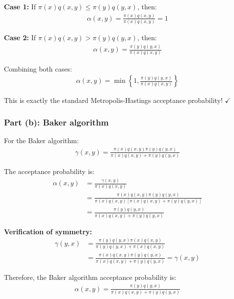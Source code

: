 \documentclass[11pt,a4paper]{article}
\begin{document}
\textbf{Case 1:} If $\pi(x)q(x,y) \leq \pi(y)q(y,x)$, then:
\begin{align}
\alpha(x,y) = \frac{\pi(x)q(x,y)}{\pi(x)q(x,y)} = 1
\end{align}

\textbf{Case 2:} If $\pi(x)q(x,y) > \pi(y)q(y,x)$, then:
\begin{align}
\alpha(x,y) = \frac{\pi(y)q(y,x)}{\pi(x)q(x,y)}
\end{align}

Combining both cases:
\begin{align}
\alpha(x,y) = \min\left\{1, \frac{\pi(y)q(y,x)}{\pi(x)q(x,y)}\right\}
\end{align}

This is exactly the standard Metropolis-Hastings acceptance probability! $\checkmark$

\subsubsection{Part (b): Baker algorithm}

For the Baker algorithm:
\begin{align}
\gamma(x,y) = \frac{\pi(x)q(x,y)\pi(y)q(y,x)}{\pi(x)q(x,y) + \pi(y)q(y,x)}
\end{align}

The acceptance probability is:
\begin{align}
\alpha(x,y) &= \frac{\gamma(x,y)}{\pi(x)q(x,y)}\\
&= \frac{\pi(x)q(x,y)\pi(y)q(y,x)}{\pi(x)q(x,y)[\pi(x)q(x,y) + \pi(y)q(y,x)]}\\
&= \frac{\pi(y)q(y,x)}{\pi(x)q(x,y) + \pi(y)q(y,x)}
\end{align}

\textbf{Verification of symmetry:}
\begin{align}
\gamma(y,x) &= \frac{\pi(y)q(y,x)\pi(x)q(x,y)}{\pi(y)q(y,x) + \pi(x)q(x,y)}\\
&= \frac{\pi(x)q(x,y)\pi(y)q(y,x)}{\pi(x)q(x,y) + \pi(y)q(y,x)} = \gamma(x,y)
\end{align}

Therefore, the Baker algorithm acceptance probability is:
\begin{align}
\boxed{\alpha(x,y) = \frac{\pi(y)q(y,x)}{\pi(x)q(x,y) + \pi(y)q(y,x)}}
\end{align}
\end{document}
